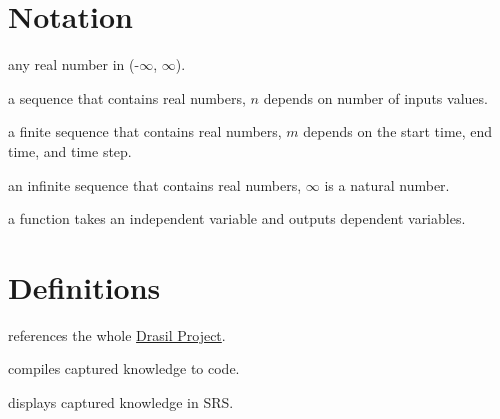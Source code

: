 
\section*{Notation}
\begin{description}[font=\rmfamily\bfseries, leftmargin=3.5cm, style=nextline]
	\item[$\mathbb{R}$] any real number in (-$\infty$, $\infty$).
	\item[$\mathbb{R}^n$] a sequence that contains real numbers, $n$ depends on number of inputs values.
	\item[$\mathbb{R}^m$] a finite sequence that contains real numbers, $m$ depends on the start time, end time, and time step.
	\item[$\mathbb{R}^{\infty}$] an infinite sequence that contains real numbers, $\infty$ is a natural number.
	\item[$\mathbb{R} \rightarrow \mathbb{R}^k$] a function takes an independent variable and outputs dependent variables.
\end{description}

\section*{Definitions}
\begin{description}[font=\rmfamily\bfseries, leftmargin=5cm, style=nextline]
	\item[Drasil Framework] references the whole \href{https://jacquescarette.github.io/Drasil/}{Drasil Project}.
	\item[Drasil Code Generator] compiles captured knowledge to code.
	\item[Drasil Printer] displays captured knowledge in SRS.
\end{description}

